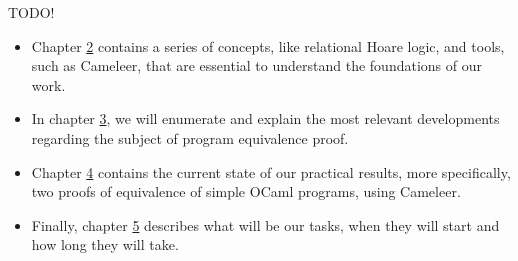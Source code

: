 TODO!
\begin{itemize}
    \setlength\itemsep{0.1em}
    \item Chapter \hyperref[cha:background]{2} contains a series of concepts, like relational Hoare logic, and tools, such as Cameleer, that are essential to understand the foundations of our work.

    \item In chapter \hyperref[cha:state_of_the_art]{3}, we will enumerate and explain the most relevant developments regarding the subject of program equivalence proof.

    \item Chapter \hyperref[cha:preliminary_results]{4} contains the current state of our practical results, more specifically, two proofs of equivalence of simple OCaml programs, using Cameleer.

    \item Finally, chapter \hyperref[cha:work_plan]{5} describes what will be our tasks, when they will start and how long they will take.

\end{itemize}

